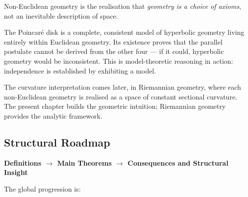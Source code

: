

\begin{tcolorbox}[
  colback=gray!6,
  colframe=gray!40,
  arc=2pt,
  left=8pt, right=8pt, top=6pt, bottom=6pt,
  title={\small\textbf{Structural Role: Non-Euclidean Geometry — Geometry is a Choice}},
  fonttitle=\small\bfseries
]
Non-Euclidean geometry is the realisation that \emph{geometry
is a choice of axioms}, not an inevitable description of space.

The Poincar\'e disk is a complete, consistent model of hyperbolic
geometry living entirely within Euclidean geometry.
Its existence proves that the parallel postulate cannot be
derived from the other four --- if it could, hyperbolic geometry
would be inconsistent.
This is model-theoretic reasoning in action: independence is
established by exhibiting a model.

The curvature interpretation comes later, in Riemannian geometry,
where each non-Euclidean geometry is realised as a space of
constant sectional curvature.
The present chapter builds the geometric intuition; Riemannian
geometry provides the analytic framework.
\end{tcolorbox}
\vspace{1em}

\subsection*{Structural Roadmap}

\begin{center}
\textbf{Definitions $\longrightarrow$ Main Theorems
$\longrightarrow$ Consequences and Structural Insight}
\end{center}

The global progression is:

